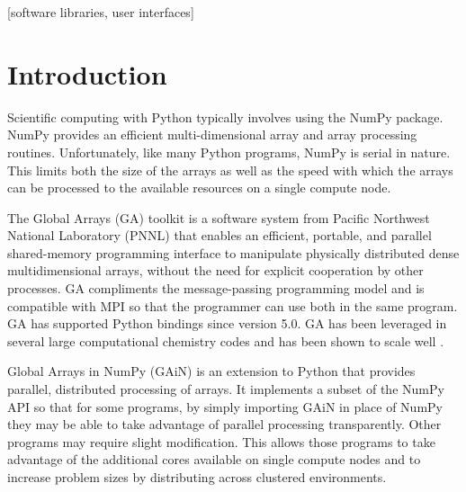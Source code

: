\documentclass{sig-alt-release2}
\begin{document}
[software libraries, user interfaces]



\section{Introduction}
Scientific computing with Python\cite{Ros90} typically involves using the
NumPy\cite{Oli06}  package.  NumPy provides an efficient multi-dimensional
array and array processing routines. Unfortunately, like many Python programs,
NumPy is serial in nature.  This limits both the size of the arrays as well as
the speed with which the arrays can be processed to the available resources on
a single compute node.


The Global Arrays (GA) toolkit \cite{Nie06,Pnl11} is a software system
from Pacific Northwest National Laboratory (PNNL) that enables an efficient,
portable, and parallel shared-memory programming interface to manipulate
physically distributed dense multidimensional arrays, without the need for
explicit cooperation by other processes. GA compliments the message-passing
programming model and is compatible with MPI\cite{Gro99a} so that the
programmer can use both in the same program. GA has supported Python bindings
since version 5.0. GA has been leveraged in several large computational
chemistry codes and has been shown to scale well \cite{Apr09}.

Global Arrays in NumPy (GAiN)\cite{Dai09,Dai11} is an extension to Python that
provides parallel, distributed processing of arrays. It implements a subset of
the NumPy API so that for some programs, by simply importing GAiN in place of
NumPy they may be able to take advantage of parallel processing transparently.
Other programs may require slight modification. This allows those programs to
take advantage of the additional cores available on single compute nodes and to
increase problem sizes by distributing across clustered environments.
\end{document}
